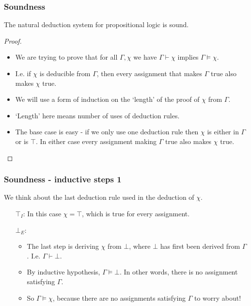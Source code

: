 \documentclass[handout]{beamer}
\begin{document}
\begin{frame}
\frametitle{Soundness}
\begin{theorem}
The natural deduction system for propositional logic is sound.
\end{theorem}
\begin{proof}
\begin{itemize}
\item We are trying to prove that for all $\Gamma,\chi$ we have $\Gamma \vdash \chi$ implies $\Gamma\models \chi$.
\item I.e. if $\chi$ is deducible from $\Gamma$, then every assignment that makes $\Gamma$ true also makes $\chi$ true.
\item We will use a form of induction on the `length' of the proof of $\chi$ from $\Gamma$.
\item `Length' here means number of uses of deduction rules.
\item The base case is easy - if we only use one deduction rule then $\chi$ is either in $\Gamma$ or is $\top$. In either case every assignment making $\Gamma$ true also makes $\chi$ true. 
\end{itemize} 
\end{proof}
\end{frame}

\begin{frame}
\frametitle{Soundness - inductive steps 1}
We think about the last deduction rule used in the deduction of $\chi$.
\vspace{1cm}
\begin{itemize}
\item[$\top_I$:] In this case $\chi=\top$, which is true for every assignment.
\vspace{1cm}
\item[$\bot_E$:] \begin{itemize}
\item The last step is deriving $\chi$ from $\bot$, where $\bot$ has first been derived from $\Gamma$. I.e. $\Gamma\vdash \bot$.
\item By inductive hypothesis, $\Gamma\models\bot$. In other words, there is no assignment satisfying $\Gamma$. 
\item So $\Gamma\models \chi$, because there are no assignments satisfying $\Gamma$ to worry about!
\end{itemize}
\end{itemize}
\end{frame}
\end{document}
